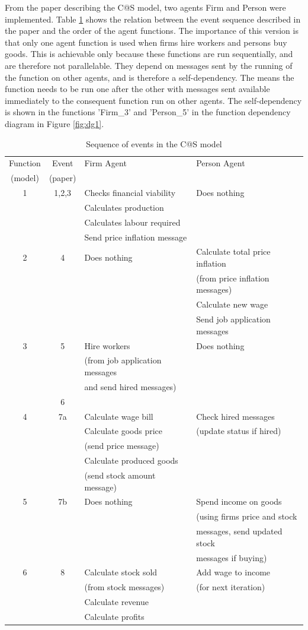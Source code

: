 \documentclass[a4paper,11pt]{article}
\begin{document}
From the paper describing the C@S model, two agents Firm and Person were implemented. Table \ref{tabcas} shows the relation between the event sequence described in the paper and the order of the agent functions.
The importance of this version is that only one agent function is used
when firms hire workers and persons buy goods. This is achievable
only because these functions are run sequentially, and are therefore
not parallelable. They depend on messages sent by the running of the
function on other agents, and is therefore a self-dependency. The means the
function needs to be run one after the other with messages sent
available immediately to the consequent function run on other
agents. The self-dependency is shown in the functions 'Firm\_3' and 'Person\_5' in the function
dependency diagram in Figure \ref{fig:dg1}.

\begin{table}[hbtp]
\centering
\begin{tabular}{|c|c|l|l|}
\hline
Function&Event&Firm Agent&Person Agent\\
(model)&(paper)&&\\
\hline \hline
1&1,2,3&Checks financial viability&Does nothing\\
&&Calculates production&\\
&&Calculates labour required&\\
&&Send price inflation message&\\
\hline
2&4&Does nothing&Calculate total price inflation\\
&&&(from price inflation messages)\\
&&&Calculate new wage\\
&&&Send job application messages\\
\hline
3&5&Hire workers&Does nothing\\
&&(from job application messages&\\
&&and send hired messages)&\\
\hline
&6&&\\
\hline
4&7a&Calculate wage bill&Check hired messages\\
&&Calculate goods price&(update status if hired)\\
&&(send price message)&\\
&&Calculate produced goods&\\
&&(send stock amount message)&\\
\hline
5&7b&Does nothing&Spend income on goods\\
&&&(using firms price and stock\\
&&&messages, send updated stock\\
&&&messages if buying)\\
\hline
6&8&Calculate stock sold&Add wage to income\\
&&(from stock messages)&(for next iteration)\\
&&Calculate revenue&\\
&&Calculate profits&\\
\hline
\end{tabular}
\caption{Sequence of events in the C@S model} \label{tabcas}
\end{table}
\end{document}
